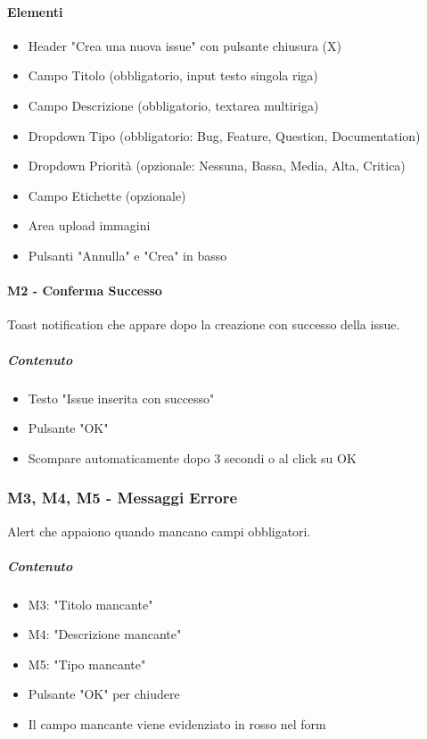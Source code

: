 \paragraph{Elementi}
\begin{itemize}[leftmargin=1.1em]
\item Header "Crea una nuova issue" con pulsante chiusura (X)
\item Campo Titolo (obbligatorio, input testo singola riga)
\item Campo Descrizione (obbligatorio, textarea multiriga)
\item Dropdown Tipo (obbligatorio: Bug, Feature, Question, Documentation)
\item Dropdown Priorità (opzionale: Nessuna, Bassa, Media, Alta, Critica)
\item Campo Etichette (opzionale)
\item Area upload immagini
\item Pulsanti "Annulla" e "Crea" in basso
\end{itemize}

\paragraph{M2 - Conferma Successo}

Toast notification che appare dopo la creazione con successo della issue.

\subparagraph{Contenuto}
\begin{itemize}[leftmargin=1.1em]
\item Testo "Issue inserita con successo"
\item Pulsante "OK"
\item Scompare automaticamente dopo 3 secondi o al click su OK
\end{itemize}

\subsubsection{M3, M4, M5 - Messaggi Errore}

Alert che appaiono quando mancano campi obbligatori.

\subparagraph{Contenuto}
\begin{itemize}[leftmargin=1.1em]
\item M3: "Titolo mancante"
\item M4: "Descrizione mancante"
\item M5: "Tipo mancante"
\item Pulsante "OK" per chiudere
\item Il campo mancante viene evidenziato in rosso nel form
\end{itemize}

